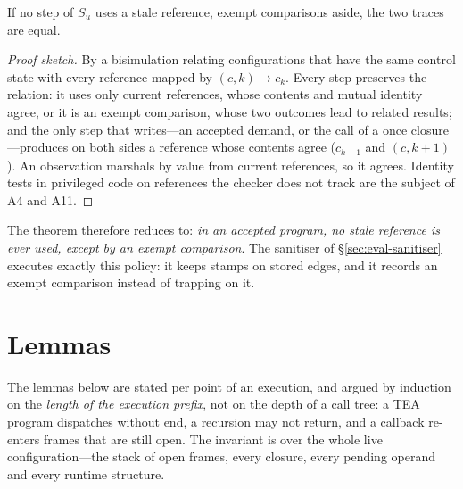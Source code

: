 \begin{lemma}
\label{lem:stale}
If no step of $S_u$ uses a stale reference, exempt comparisons aside, the two traces are equal.
\end{lemma}
\begin{proof}[Proof sketch]
By a bisimulation relating configurations that have the same control state with every reference mapped
by $(c, k) \mapsto c_k$. Every step preserves the relation: it uses only current references, whose
contents and mutual identity agree, or it is an exempt comparison, whose two outcomes lead to related
results; and the only step that writes---an accepted demand, or the call of a once closure---produces on
both sides a reference whose contents agree ($c_{k+1}$ and $(c, k+1)$). An observation marshals by value
from current references, so it agrees. Identity tests in privileged code on references the checker does
not track are the subject of A4 and A11.
\end{proof}

The theorem therefore reduces to: \emph{in an accepted program, no stale reference is ever used, except
by an exempt comparison}. The sanitiser of \S\ref{sec:eval-sanitiser} executes exactly this policy: it
keeps stamps on stored edges, and it records an exempt comparison instead of trapping on it.

\section{Lemmas}

The lemmas below are stated per point of an execution, and argued by induction on the \emph{length of
the execution prefix}, not on the depth of a call tree: a TEA program dispatches without end, a
recursion may not return, and a callback re-enters frames that are still open. The invariant is over
the whole live configuration---the stack of open frames, every closure, every pending operand and
every runtime structure.

